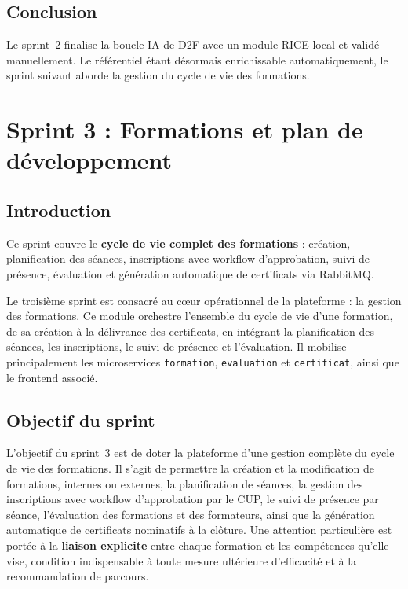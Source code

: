 \documentclass[12pt,a4paper]{report}
\begin{document}
\section{Conclusion}

Le sprint~2 finalise la boucle IA de D2F avec un module RICE local et validé
manuellement. Le référentiel étant désormais enrichissable automatiquement, le
sprint suivant aborde la gestion du cycle de vie des formations.
\clearpage
\chapter{Sprint 3 : Formations et plan de développement}

\section{Introduction}

\begin{summaryframe}[frametitle={En bref — Sprint 3}]
Ce sprint couvre le \textbf{cycle de vie complet des formations} : création,
planification des séances, inscriptions avec workflow d'approbation, suivi de
présence, évaluation et génération automatique de certificats via RabbitMQ.
\end{summaryframe}

Le troisième sprint est consacré au cœur opérationnel de la plateforme : la
gestion des formations. Ce module orchestre l'ensemble du cycle de vie d'une
formation, de sa création à la délivrance des certificats, en intégrant la
planification des séances, les inscriptions, le suivi de présence et
l'évaluation. Il mobilise principalement les microservices \texttt{formation},
\texttt{evaluation} et \texttt{certificat}, ainsi que le frontend associé.

\section{Objectif du sprint}

L'objectif du sprint~3 est de doter la plateforme d'une gestion complète du
cycle de vie des formations. Il s'agit de permettre la création et la
modification de formations, internes ou externes, la planification de séances,
la gestion des inscriptions avec workflow d'approbation par le CUP, le suivi de
présence par séance, l'évaluation des formations et des formateurs, ainsi que
la génération automatique de certificats nominatifs à la clôture. Une attention
particulière est portée à la \textbf{liaison explicite} entre chaque formation
et les compétences qu'elle vise, condition indispensable à toute mesure
ultérieure d'efficacité et à la recommandation de parcours.
\end{document}
